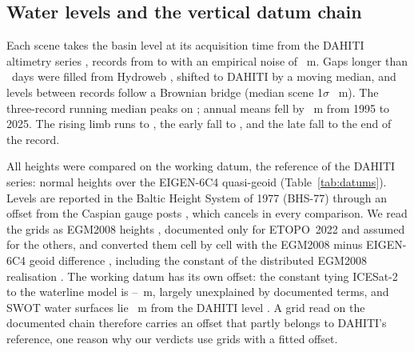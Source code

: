 \subsection{Water levels and the vertical datum chain}
\label{sec:levels}
Each scene takes the basin level at its acquisition time from the DAHITI altimetry series \citep{schwatke2015,dahiti_wl},  records from  to  with an empirical noise of ~m. Gaps longer than ~days were filled from Hydroweb \citep{cretaux2011,hydrowebwl}, shifted to DAHITI by a moving median, and levels between records follow a Brownian bridge (median scene 1$\sigma$ ~m). The three-record running median peaks on ; annual means fell by ~m from 1995 to 2025. The rising limb runs to , the early fall to , and the late fall to the end of the record.

All heights were compared on the working datum, the reference of the DAHITI series: normal heights over the EIGEN-6C4 quasi-geoid \citep{schwatke2015,dahiti_wl,forste2014} (Table~\ref{tab:datums}). Levels are reported in the Baltic Height System of 1977 (BHS-77) through an offset from the Caspian gauge posts \citep{caspcom2026}, which cancels in every comparison. We read the grids as EGM2008 heights \citep{pavlis2012}, documented only for ETOPO~2022 and assumed for the others, and converted them cell by cell with the EGM2008 minus EIGEN-6C4 geoid difference \citep{ince2019}, including the constant of the distributed EGM2008 realisation \citep{geographiclib_gravity,icgem_faq}. The working datum has its own offset: the constant tying ICESat-2 to the waterline model is --~m, largely unexplained by documented terms, and SWOT water surfaces lie ~m from the DAHITI level \citep{swot_raster_d,swot_pdd_raster}. A grid read on the documented chain therefore carries an offset that partly belongs to DAHITI's reference, one reason why our verdicts use grids with a fitted offset. 

